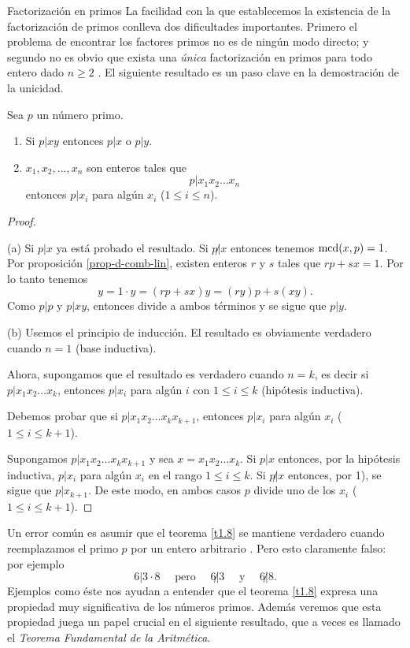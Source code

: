 \begin{section}{Factorización en primos}
La facilidad con la que establecemos la existencia de la
factorización de primos conlleva dos dificultades importantes.
Primero el problema de encontrar los factores primos no es de
ningún modo directo; y segundo no es obvio que exista una {\it
única} factorización en primos para todo entero dado $n\ge 2$ . El
siguiente resultado es un paso clave en la demostración de la
unicidad.

\begin{teorema}\label{t1.8} Sea $p$  un número  primo.

\begin{enumerate}[label=(\alph*)]
\item Si $p|xy$ entonces $p|x$ o $p|y$.
\item $x_1,x_2,\ldots,x_n$ son enteros tales que
$$
p|x_1x_2\ldots x_n
$$
entonces $p|x_i$ para algún $x_i$ ($1\le i \le n$).
\end{enumerate}
\end{teorema}
\begin{proof}
\

\noindent(a)  Si $p|x$ ya está probado el resultado. Si $p{{\not|}}x$ entonces tenemos $\operatorname{mcd}(x,p)=1$. Por proposición \ref{prop-d-comb-lin}, existen enteros $r$ y $s$ tales que $rp+sx=1$. Por lo
tanto tenemos 
$$
y = 1 \cdot y = (rp+sx)y =(ry)p+s(xy).
$$
Como $p|p$ y $p|xy$, entonces divide a ambos términos y se sigue que $p|y$. 

\noindent(b) Usemos el principio de inducción. El resultado
es obviamente verdadero cuando $n=1$ (base inductiva). 

Ahora, supongamos que el resultado es verdadero cuando $n=k$, es decir si $p|x_1x_2\ldots x_k$, entonces 
$p|x_i$ para algún $i$ con $1\le i \le k$ (hipótesis inductiva).

Debemos probar que si $p|x_1x_2\ldots x_{k}x_{k+1}$, entonces  $p|x_i$ para algún $x_i$ ($1\le i \le k+1$).

Supongamos $p|x_1x_2\ldots x_{k}x_{k+1}$ y sea $x=x_1x_2\ldots x_k$. Si $p|x$
entonces, por la hipótesis inductiva, $p|x_i$ para algún $x_i$ en
el rango $1\le i \le k$. Si $p{{\not|}}x$ entonces, por 1), se sigue que $p|x_{k+1}$. De
este modo, en ambos casos $p$ divide uno de los $x_i$ ($1\le i\le
k+1$). 
\end{proof}

Un error común es asumir que el teorema \ref{t1.8} se mantiene
verdadero cuando reemplazamos el primo $p$ por un entero
arbitrario . Pero esto claramente falso: por ejemplo
$$
6| 3\cdot 8 \quad \text{ pero } \quad 6{\not|} 3 \quad \text{ y }
\quad 6{\not|}8.
$$
Ejemplos como éste nos ayudan a entender que el teorema \ref{t1.8}
expresa una propiedad muy significativa de los números primos.
Además veremos que esta propiedad juega un papel crucial en el
siguiente resultado, que a veces es llamado el {\it Teorema
Fundamental de la Aritmética}.


\end{section}
